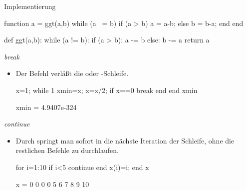\documentclass[hyperref={xetex}]{beamer}
\begin{document}
\begin{frame}[fragile]{Implementierung}
\begin{matlabin}
function a = ggt(a,b)
while (a ~= b)
  if (a > b)
    a = a-b;
  else
    b = b-a;
  end
end
\end{matlabin}
\begin{pyin}
def ggt(a,b):
  while (a != b):
    if (a > b):
      a -= b
    else:
      b -= a
  return a
\end{pyin}
\end{frame}
%
%
%
\begin{frame}[fragile]{\textit{break}}
\begin{itemize}
\item  Der Befehl  verläßt die  oder
  -Schleife.
\begin{matlabin}
x=1;
while 1
  xmin=x;
  x=x/2;
  if x==0
    break
  end
end
xmin
\end{matlabin}
\begin{matlab}
xmin = 4.9407e-324
\end{matlab} 

\end{itemize}
\end{frame}

\begin{frame}[fragile]{\textit{continue}}
\begin{itemize}
 \item  Durch  springt man sofort in die
  nächste Iteration der Schleife, ohne die restlichen Befehle zu
  durchlaufen.
\begin{matlabin}
for i=1:10
  if i<5
    continue
  end
  x(i)=i;
end
x
\end{matlabin}
\begin{matlab}
x =  0  0  0  0  5  6  7  8  9  10
\end{matlab}
 
\end{itemize}
\end{frame}
\end{document}
